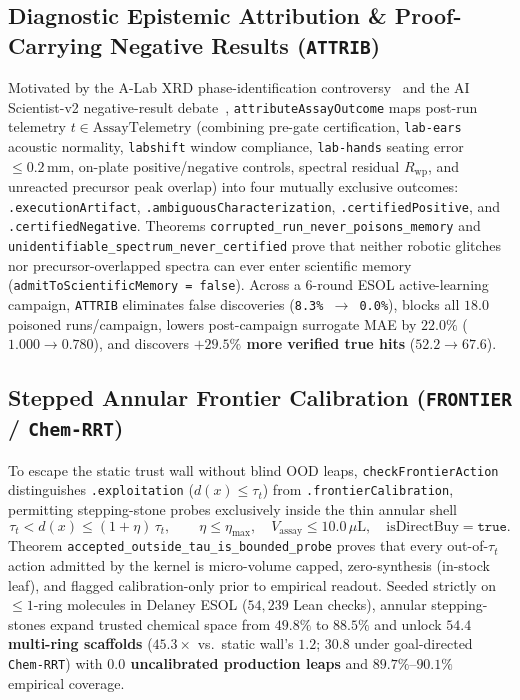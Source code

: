 \documentclass[10pt,letterpaper]{article}
\begin{document}
\subsection{Diagnostic Epistemic Attribution \& Proof-Carrying Negative Results (\texttt{ATTRIB})}
Motivated by the A-Lab XRD phase-identification controversy~\cite{szymanski2023alab,palgrave2024alabcritique} and the AI Scientist-v2 negative-result debate~\cite{yamada2025aiscientistv2}, \texttt{attributeAssayOutcome} maps post-run telemetry $t \in \mathrm{AssayTelemetry}$ (combining pre-gate certification, \texttt{lab-ears} acoustic normality, \texttt{labshift} window compliance, \texttt{lab-hands} seating error $\le 0.2\,\text{mm}$, on-plate positive/negative controls, spectral residual $R_{\mathrm{wp}}$, and unreacted precursor peak overlap) into four mutually exclusive outcomes: \texttt{.executionArtifact}, \texttt{.ambiguous\allowbreak Characterization}, \texttt{.certifiedPositive}, and \texttt{.certifiedNegative}. Theorems \texttt{corrupted\_run\_\allowbreak never\_poisons\_memory} and \texttt{unidentifiable\_spectrum\_\allowbreak never\_certified} prove that neither robotic glitches nor precursor-overlapped spectra can ever enter scientific memory (\texttt{admitTo\allowbreak ScientificMemory = false}). Across a 6-round ESOL active-learning campaign, \texttt{ATTRIB} eliminates false discoveries (\texttt{8.3\% $\to$ 0.0\%}), blocks all $18.0$ poisoned runs/campaign, lowers post-campaign surrogate MAE by $22.0\%$ ($1.000 \to 0.780$), and discovers \textbf{$+29.5\%$ more verified true hits} ($52.2 \to 67.6$).

\subsection{Stepped Annular Frontier Calibration (\texttt{FRONTIER} / \texttt{Chem-RRT})}
To escape the static trust wall without blind OOD leaps, \texttt{checkFrontierAction} distinguishes \texttt{.exploitation} ($d(x) \le \tau_t$) from \texttt{.frontierCalibration}, permitting stepping-stone probes exclusively inside the thin annular shell
\begin{equation}
  \tau_t < d(x) \le (1 + \eta)\,\tau_t, \qquad \eta \le \eta_{\max}, \quad V_{\mathrm{assay}} \le 10.0\,\mu\text{L}, \quad \mathrm{isDirectBuy} = \texttt{true}.
\end{equation}
Theorem \texttt{accepted\_outside\_tau\_is\_bounded\_probe} proves that every out-of-$\tau_t$ action admitted by the kernel is micro-volume capped, zero-synthesis (in-stock leaf), and flagged calibration-only prior to empirical readout. Seeded strictly on $\le 1$-ring molecules in Delaney ESOL ($54{,}239$ Lean checks), annular stepping-stones expand trusted chemical space from $49.8\%$ to \textbf{$88.5\%$} and unlock \textbf{$54.4$ multi-ring scaffolds} ($45.3\times$ vs.\ static wall's $1.2$; $30.8$ under goal-directed \texttt{Chem-RRT}) with \textbf{$0.0$ uncalibrated production leaps} and $89.7\%\text{--}90.1\%$ empirical coverage.
\end{document}
